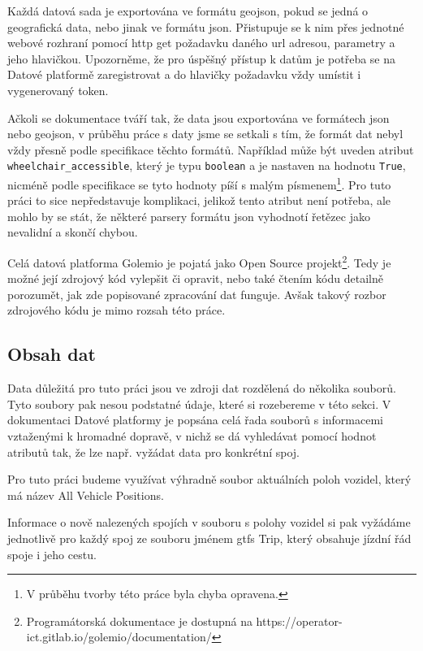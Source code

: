 Každá datová sada je exportována ve formátu \gls{geojson}, pokud se jedná o geografická data, nebo jinak ve formátu \gls{json}. Přistupuje se k nim přes jednotné webové rozhraní pomocí \gls{http} get požadavku daného \gls{url} adresou, parametry a jeho hlavičkou. Upozorněme, že pro úspěšný přístup k datům je potřeba se na Datové platformě zaregistrovat a do hlavičky požadavku vždy umístit i vygenerovaný token.

\bigbreak

Ačkoli se dokumentace tváří tak, že data jsou exportována ve formátech \gls{json} nebo \gls{geojson}, v průběhu práce s daty jsme se setkali s tím, že formát dat nebyl vždy přesně podle specifikace těchto formátů. Například může být uveden atribut \verb"wheelchair_accessible", který je typu \verb"boolean" a je nastaven na hodnotu \verb"True", nicméně podle specifikace se tyto hodnoty píší s malým písmenem\footnote{V průběhu tvorby této práce byla chyba opravena.}. Pro tuto práci to sice nepředstavuje komplikaci, jelikož tento atribut není potřeba, ale mohlo by se stát, že některé parsery formátu \gls{json} vyhodnotí řetězec jako nevalidní a skončí chybou.

\bigbreak

Celá datová platforma Golemio je pojatá jako Open Source projekt\footnote{Programátorská dokumentace je dostupná na https://operator-ict.gitlab.io/golemio/documentation/}. Tedy je možné její zdrojový kód vylepšit či opravit, nebo také čtením kódu detailně porozumět, jak zde popisované zpracování dat funguje. Avšak takový rozbor zdrojového kódu je mimo rozsah této práce.

\subsection{Obsah dat}

Data důležitá pro tuto práci jsou ve zdroji dat rozdělená do několika souborů. Tyto soubory pak nesou podstatné údaje, které si rozebereme v této sekci. V dokumentaci Datové platformy je popsána celá řada souborů s informacemi vztaženými k hromadné dopravě, v nichž se dá vyhledávat pomocí hodnot atributů tak, že lze např. vyžádat data pro konkrétní spoj.

\bigbreak

Pro tuto práci budeme využívat výhradně soubor aktuálních poloh vozidel, který má název All Vehicle Positions.

\bigbreak

Informace o nově nalezených spojích v souboru s polohy vozidel si pak vyžádáme jednotlivě pro každý spoj ze souboru jménem \gls{gtfs} Trip, který obsahuje jízdní řád spoje i jeho cestu.

